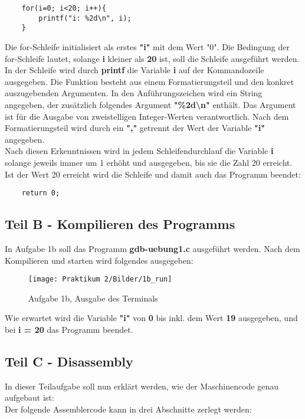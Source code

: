 \documentclass[12pt]{article}
\begin{document}
\begin{lstlisting}
    for(i=0; i<20; i++){
        printf("i: %2d\n", i);
    }
\end{lstlisting}

Die for-Schleife initialisiert als erstes \textbf{"i"} mit dem Wert "0". Die Bedingung der for-Schleife lautet, solange \textbf{i} kleiner als \textbf{20} ist, soll die Schleife ausgeführt werden. In der Schleife wird durch \textbf{printf} die Variable \textbf{i} auf der Kommandozeile ausgegeben. Die Funktion besteht aus einem Formatierungsteil und den konkret auszugebenden Argumenten. In den Anführungszeichen wird ein String angegeben, der zusätzlich folgendes Argument \textbf{"\%2d\textbackslash n"} enthält. Das Argument ist für die Ausgabe von zweistelligen Integer-Werten verantwortlich. Nach dem Formatierungsteil wird durch ein \textbf{","} getrennt der Wert der Variable \textbf{"i"} angegeben.\\
Nach diesen Erkenntnissen wird in jedem Schleifendurchlauf die Variable \textbf{i} solange jeweils immer um 1 erhöht und ausgegeben, bis sie die Zahl 20 erreicht. Ist der Wert 20 erreicht wird die Schleife und damit auch das Programm beendet:\\
\begin{lstlisting}
    return 0;
\end{lstlisting}
\newpage

\subsection{Teil B - Kompilieren des Programms}

In Aufgabe 1b soll das Programm \textbf{gdb-uebung1.c} ausgeführt werden. Nach dem Kompilieren und starten wird folgendes ausgegeben:
\\
\begin{figure}[htbp]
    \centering
    \texttt{[image: Praktikum 2/Bilder/1b\_run]}
    \caption{Aufgabe 1b, Ausgabe des Terminals}
    \label{fig:Uebung1b}
\end{figure}

Wie erwartet wird die Variable \textbf{"i"} von \textbf{0} bis inkl. dem Wert \textbf{19} ausgegeben, und bei \textbf{i = 20} das Programm beendet.
\newpage

\subsection{Teil C - Disassembly}
In dieser Teilaufgabe soll nun erklärt werden, wie der Maschinencode genau aufgebaut ist:\\
Der folgende Assemblercode kann in drei Abschnitte zerlegt werden:\\
\end{document}
